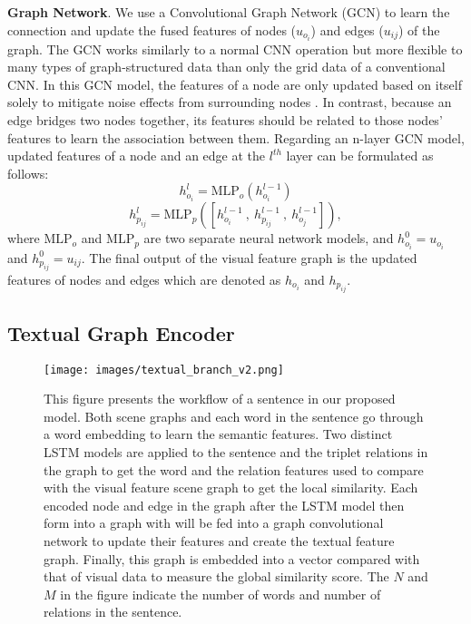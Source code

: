 \documentclass{IOS-Book-Article}
\begin{document}
\textbf{Graph Network}. We use a Convolutional Graph Network (GCN) to learn the connection and update the fused features of nodes ($u_{o_i}$) and edges ($u_{ij}$) of the graph. The GCN works similarly to a normal CNN operation but more flexible to many types of graph-structured data than only the grid data of a conventional CNN. In this GCN model, the features of a node are only updated based on itself solely to mitigate noise effects from surrounding nodes \cite{wang2020cross}. In contrast, because an edge bridges two nodes together, its features should be related to those nodes' features to learn the association between them. Regarding an n-layer GCN model, updated features of a node and an edge at the $l^{th}$ layer can be formulated as follows:
\begin{equation}
h^l_{o_i} = \text{MLP}_o(h^{l-1}_{o_i})
\label{eq:gcn_o}
\end{equation}
\begin{equation}
h^l_{p_{ij}} = \text{MLP}_p([h^{l-1}_{o_i}\:,\:h^{l-1}_{p_{ij}}\:,\:h^{l-1}_{o_j}]),
\label{eq:gcn_p}
\end{equation}
where $\text{MLP}_o$ and $\text{MLP}_p$ are two separate neural network models, and $h^0_{o_i}=u_{o_i}$ and $h^0_{p_{ij}}=u_{ij}$. The final output of the visual feature graph is the updated features of nodes and edges which are denoted as $h_{o_i}$ and $h_{p_{ij}}$.

\subsection{Textual Graph Encoder}
\begin{figure*}[h]
  \centering
  \texttt{[image: images/textual\_branch\_v2.png]}
  \caption{This figure presents the workflow of a sentence in our proposed model. Both scene graphs and each word in the sentence go through a word embedding to learn the semantic features. Two distinct LSTM models are applied to the sentence and the triplet relations in the graph to get the word and the relation features used to compare with the visual feature scene graph to get the local similarity. Each encoded node and edge in the graph after the LSTM model then form into a graph with will be fed into a graph convolutional network to update their features and create the textual feature graph. Finally, this graph is embedded into a vector compared with that of visual data to measure the global similarity score. The $N$ and $M$ in the figure indicate the number of words and number of relations in the sentence.}
  \label{fig:textual_branch}
\end{figure*}
\end{document}
